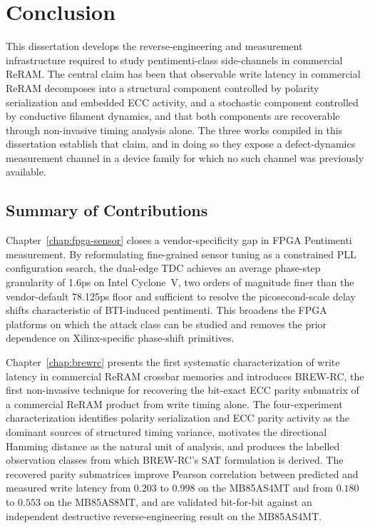 \chapter{Conclusion}

\label{chap:conclusion}

This dissertation develops the reverse-engineering and measurement
infrastructure required to study pentimenti-class side-channels in
commercial ReRAM. The central claim has been that observable write
latency in commercial ReRAM decomposes into a structural component
controlled by polarity serialization and embedded ECC activity, and a
stochastic component controlled by conductive filament dynamics, and
that both components are recoverable through non-invasive timing
analysis alone. The three works compiled in this dissertation establish
that claim, and in doing so they expose a defect-dynamics measurement
channel in a device family for which no such channel was previously
available.

\section{Summary of Contributions}

Chapter~\ref{chap:fpga-sensor} closes a vendor-specificity gap in FPGA
Pentimenti measurement. By reformulating fine-grained sensor tuning as a
constrained PLL configuration search, the dual-edge TDC achieves an
average phase-step granularity of 1.6ps on Intel Cyclone~V, two orders
of magnitude finer than the vendor-default 78.125ps floor and sufficient
to resolve the picosecond-scale delay shifts characteristic of
BTI-induced pentimenti. This broadens the FPGA platforms on which the
attack class can be studied and removes the prior dependence on
Xilinx-specific phase-shift primitives.

Chapter~\ref{chap:brewrc} presents the first systematic characterization
of write latency in commercial ReRAM crossbar memories and introduces
BREW-RC, the first non-invasive technique for recovering the bit-exact
ECC parity submatrix of a commercial ReRAM product from write timing
alone. The four-experiment characterization identifies polarity
serialization and ECC parity activity as the dominant sources of
structured timing variance, motivates the directional Hamming distance
as the natural unit of analysis, and produces the labelled observation
classes from which BREW-RC's SAT formulation is derived. The recovered
parity submatrices improve Pearson correlation between predicted and
measured write latency from $0.203$ to $0.998$ on the MB85AS4MT and from
$0.180$ to $0.553$ on the MB85AS8MT, and are validated bit-for-bit
against an independent destructive reverse-engineering result on the
MB85AS4MT.

